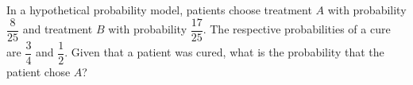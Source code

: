 In a hypothetical probability model, patients choose treatment $A$ with probability $\dfrac{8}{25}$ and treatment $B$ with probability $\dfrac{17}{25}$. The respective probabilities of a cure are $\dfrac{3}{4}$ and $\dfrac{1}{2}$. Given that a patient was cured, what is the probability that the patient chose $A$?
